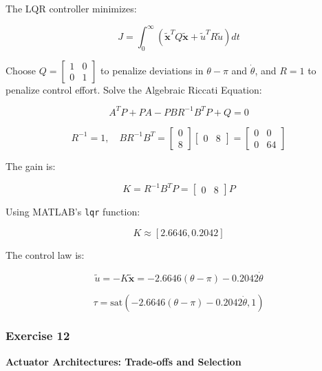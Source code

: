 \documentclass[12pt,a4paper]{article}
\begin{document}
The LQR controller minimizes:

\begin{equation}
J = \int_0^\infty \left( \tilde{\mathbf{x}}^T Q \tilde{\mathbf{x}} + \tilde{u}^T R \tilde{u} \right) dt
\end{equation}

Choose \( Q = \begin{bmatrix} 1 & 0 \\ 0 & 1 \end{bmatrix} \) to penalize deviations in \( \theta - \pi \) and \( \dot{\theta} \), and \( R = 1 \) to penalize control effort. Solve the Algebraic Riccati Equation:

\begin{equation}
A^T P + P A - P B R^{-1} B^T P + Q = 0
\end{equation}

\[
R^{-1} = 1, \quad B R^{-1} B^T = \begin{bmatrix} 0 \\ 8 \end{bmatrix} \begin{bmatrix} 0 & 8 \end{bmatrix} = \begin{bmatrix} 0 & 0 \\ 0 & 64 \end{bmatrix}
\]

The gain is:

\begin{equation}
K = R^{-1} B^T P = \begin{bmatrix} 0 & 8 \end{bmatrix} P
\end{equation}

Using MATLAB’s \texttt{lqr} function:

\[
K \approx [2.6646, 0.2042]
\]

The control law is:

\begin{equation}
\tilde{u} = -K \tilde{\mathbf{x}} = -2.6646 (\theta - \pi) - 0.2042 \dot{\theta}
\end{equation}

\[
\tau = \text{sat}(-2.6646 (\theta - \pi) - 0.2042 \dot{\theta}, 1)
\]



\subsubsection*{Exercise 12}
\textbf{Actuator Architectures: Trade-offs and Selection}
\end{document}
